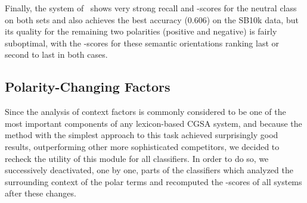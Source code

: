 Finally, the system of~\citet{Kolchyna:15} shows very strong recall
and \F{}-scores for the neutral class on both sets and also achieves
the best accuracy (0.606) on the SB10k data, but its quality for the
remaining two polarities (positive and negative) is fairly suboptimal,
with the \F{}-scores for these semantic orientations ranking last or
second to last in both cases.

\subsection{Polarity-Changing Factors}\label{subsec:cgsa:lex-methods:pol-change}

Since the analysis of context factors is commonly considered to be one
of the most important components of any lexicon-based CGSA system, and
because the method with the simplest approach to this task achieved
surprisingly good results, outperforming other more sophisticated
competitors, we decided to recheck the utility of this module for all
classifiers.  In order to do so, we successively deactivated, one by
one, parts of the classifiers which analyzed the surrounding context
of the polar terms and recomputed the \F{}-scores of all systems after
these changes.

